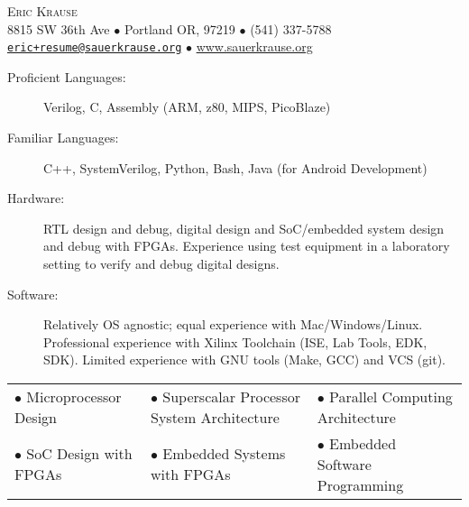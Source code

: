 \documentclass{article}
\begin{document}
\thispagestyle{firststyle} %
\small

\vspace*{-.5in} %

\begin{center}
	{\LARGE \scshape {Eric Krause}}	\\
	8815 SW 36th Ave $\bullet$ Portland OR, 97219  $\bullet$ (541) 337-5788\\
	\texttt{\href{mailto:eric+resume@sauerkrause.org}{eric+resume@sauerkrause.org}}
  $\bullet$  \url{www.sauerkrause.org}\\
\end{center}



	\vspace{-15pt}
	\begin{description}
		\item[Proficient Languages:] Verilog, C, Assembly (ARM, z80, MIPS, PicoBlaze)
		\item[Familiar Languages:] C++, SystemVerilog, Python, Bash, Java (for Android Development)
		\item[Hardware:] RTL design and debug, digital design and SoC/embedded system design and debug with FPGAs. Experience using test equipment in a laboratory setting to verify and debug digital designs.
		\item[Software:] Relatively OS agnostic; equal experience with Mac/Windows/Linux.  Professional experience with Xilinx Toolchain (ISE, Lab Tools, EDK, SDK).  Limited experience with GNU tools (Make, GCC) and VCS (git).
	\end{description}
	\vspace{-4pt}

	\begin{table}[h!]
		\small
		\vspace{-19pt}
	\begin{tabular}{lll}
	$\bullet$ Microprocessor Design & $\bullet$ Superscalar Processor System Architecture & $\bullet$ Parallel Computing Architecture\\
	$\bullet$ SoC Design with FPGAs & $\bullet$ Embedded Systems with FPGAs & $\bullet$ Embedded Software Programming\\
	\end{tabular}
	\vspace{-19pt}
\end{table}	
\end{document}
